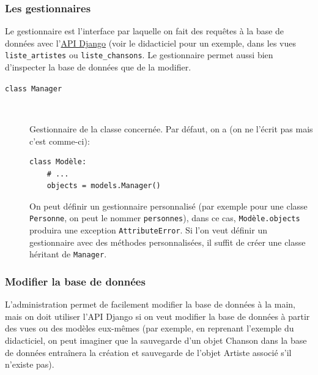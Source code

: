 \documentclass[a4paper, 10pt]{article}
\begin{document}
\subsubsection{Les gestionnaires}
Le gestionnaire  est l'interface par laquelle on fait des requêtes à la base de données avec l'\href{https://docs.djangoproject.com/fr/2.0/topics/db/queries/}{API Django} (voir le didacticiel pour un exemple, dans les vues \texttt{liste\_artistes} ou \texttt{liste\_chansons}. Le gestionnaire permet aussi bien d'inspecter la base de données que de la modifier.

\begin{description}
    \item[\texttt{class Manager}]~

          Gestionnaire de la classe concernée. Par défaut, on a (on ne l'écrit pas mais c'est comme-ci):
          \begin{verbatim}
class Modèle:
    # ...
    objects = models.Manager()
    \end{verbatim}

          On peut définir un gestionnaire personnalisé (par exemple pour une classe \texttt{Personne}, on peut le nommer \texttt{personnes}), dans ce cas, \texttt{Modèle.objects} produira une exception \texttt{AttributeError}. Si l'on veut définir un gestionnaire avec des méthodes personnalisées, il suffit de créer une classe héritant de \texttt{Manager}.
\end{description}

\subsubsection{Modifier la base de données}
L'administration  permet de facilement modifier la base de données à la main, mais on doit utiliser l'API Django si on veut modifier la base de données à partir des vues ou des modèles eux-mêmes (par exemple, en reprenant l'exemple du didacticiel, on peut imaginer que la sauvegarde d'un objet Chanson dans la base de données entraînera la création et sauvegarde de l'objet Artiste associé s'il n'existe pas).\medskip
\end{document}
